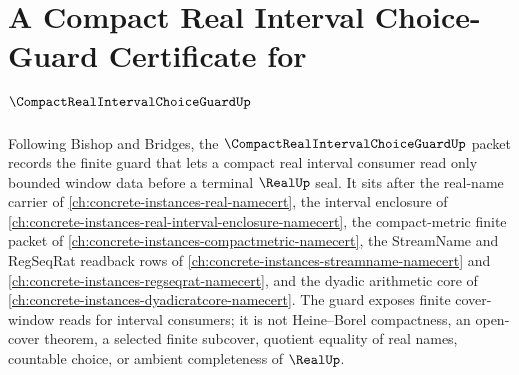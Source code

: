 \chapter{A Compact Real Interval Choice-Guard Certificate for $\CompactRealIntervalChoiceGuardUp$}
\label{ch:concrete-instances-compact-real-interval-choice-guard-namecert}

Following Bishop and Bridges, the $\CompactRealIntervalChoiceGuardUp$ packet records the finite guard that lets a compact real interval consumer read only bounded window data before a terminal $\RealUp$ seal. It sits after the real-name carrier of \autoref{ch:concrete-instances-real-namecert}, the interval enclosure of \autoref{ch:concrete-instances-real-interval-enclosure-namecert}, the compact-metric finite packet of \autoref{ch:concrete-instances-compactmetric-namecert}, the StreamName and RegSeqRat readback rows of \autoref{ch:concrete-instances-streamname-namecert} and \autoref{ch:concrete-instances-regseqrat-namecert}, and the dyadic arithmetic core of \autoref{ch:concrete-instances-dyadicratcore-namecert}. The guard exposes finite cover-window reads for interval consumers; it is not Heine--Borel compactness, an open-cover theorem, a selected finite subcover, quotient equality of real names, countable choice, or ambient completeness of $\RealUp$.

